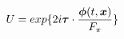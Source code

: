 \begin{equation}
U= exp{\{ 2i\mbox{\boldmath${\tau}$}\cdot \frac{\mbox{\boldmath$\phi$}(t,\mbox{\boldmath$x$})}{F_\pi} \}}
\end{equation}

